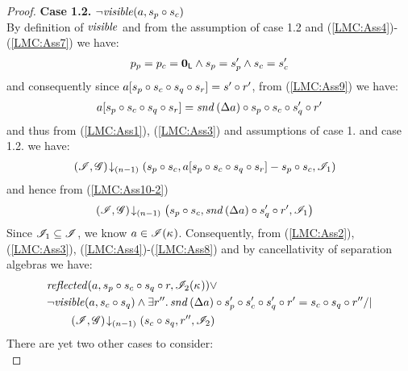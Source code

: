 \begin{lemma}
\begin{proof}
%
\noindent\textbf{Case 1.2.} $\neg\mathit{visible}(a, s_p \circ s_c)$\\
By definition of $\mathit{visible}$ and from the assumption of case 1.2 and (\ref{LMC:Ass4})-(\ref{LMC:Ass7}) we have:
%
\begin{align}
	p_p = p_c = \mathbf{0}_{\textsf{L}} \land s_p = s_p' \land s_c = s_c' \label{LMC:noOverlapPC}
\end{align}
%
and consequently since $a[s_p \circ s_c \circ s_q \circ s_r] = s' \circ r'$, from (\ref{LMC:Ass9}) we have:
%
\begin{align}
	a[s_p \circ s_c \circ s_q \circ s_r] = \mathit{snd}\left(\Delta {a}\right) \circ s_p \circ s_c \circ s_q' \circ r' \label{LMC:Ass10-2}
\end{align} 
%
and thus from (\ref{LMC:Ass1}), (\ref{LMC:Ass3}) and assumptions of case 1. and case 1.2. we have: 
%
\begin{align*}
	& \left(\mathscr{I}, \mathscr{G}\right) \!\downarrow_{(n-1)} \left(s_{p} \circ s_{c}, a[s_p \circ s_c \circ s_q \circ s_r] - s_p \circ s_c , \mathscr{I}_1\right) 
\end{align*}
and hence from (\ref{LMC:Ass10-2})
%
\begin{align}
	& \left(\mathscr{I}, \mathscr{G}\right) \!\downarrow_{(n-1)} \left(s_{p} \circ s_{c}, \mathit{snd}\left(\Delta {a}\right) \circ s_q' \circ r', \mathscr{I}_1\right) 
	\label{LMC:Ass11-2}
\end{align}
%
Since $\mathscr{I}_{1} \subseteq \mathscr{I}$, we know $a \in \mathscr{I}(\kappa_{})$. Consequently, from (\ref{LMC:Ass2}),(\ref{LMC:Ass3}), (\ref{LMC:Ass4})-(\ref{LMC:Ass8}) and by cancellativity of separation algebras we have:
\begin{align*}
	&\m{reflected}(a, s_p \composeL s_c \composeL s_q \composeL r, \lmod_{2}(\ca{})) \lor \\
	&\neg\m{visible}(a, s_c \composeL s_q) \land  \exsts{r''} \snd{\updateFP{a}} \composeL s_p' \composeL s_c' \composeL s_q' \composeL r' = s_c \composeL s_q \composeL r'' /| \null \\
	& \qquad\extendsAMUpto{\lmod, \gmod}{(n-1)}{s_c \composeL s_q}{r''}{\lmod_2}
\end{align*}
%
There are yet two other cases to consider:\\


\end{proof}
\end{lemma}
